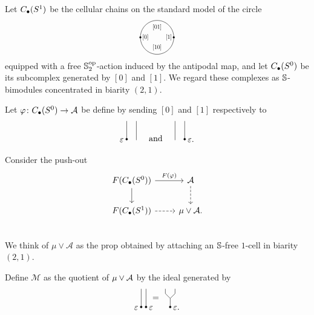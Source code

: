 Let $\chains(S^1)$ be the cellular chains on the standard model of the circle
\begin{equation*}
\begin{tikzpicture}
\draw (0,0) circle (20pt);
\node[scale=.7] at (0,12pt){$[01]$};
\node[scale=.7] at (0,-12pt){$[10]$};
\node[scale=.7] at (-14pt,0){$[0]$};
\node[scale=.7] at (14pt,0){$[1]$};
\draw [fill] (-20pt,0) circle [radius=1pt];
\draw [fill] (20pt,0) circle [radius=1pt];
\end{tikzpicture}
\end{equation*}
equipped with a free $\S^\op_2$-action induced by the antipodal map, and let $\chains(S^0)$ be its subcomplex generated by $[0]$ and $[1]$.
We regard these complexes as $\S$-bimodules concentrated in biarity $(2,1)$.

Let $\varphi \colon \chains(S^0) \to \A$ be define by sending $[0]$ and $[1]$ respectively to
\begin{equation*}
	\begin{tikzpicture}[scale=.2]
	\draw (-4,0)--(-4,4);
	\draw (-6,0)--(-6,4);
	\draw [fill] (-6,.2) circle [radius=.2];
	\node [left] at (-6,0) {$\varepsilon$};
	
	\node at (0,.4) {and};
	
	\draw (4,0)--(4,4);
	\draw (6,0)--(6,4);
	\draw [fill] (6,.2) circle [radius=.2];
	\node [right] at (6,0) {$\varepsilon$.};
	\end{tikzpicture}
\end{equation*}

Consider the push-out
\begin{equation*}
\begin{tikzcd}
F(\chains(S^0)) \arrow[r, "F(\varphi)"] \arrow[d] & \A \arrow[d, dashed] \\
F(\chains(S^1)) \arrow[r, dashed] & \mu \vee \A. \\
\end{tikzcd}
\end{equation*}
We think of $\mu \vee \mathcal A$ as the prop obtained by attaching an $\S$-free $1$-cell in biarity $(2,1)$.

Define $\mathcal M$ as the quotient of $\mu \vee \A$ by the ideal generated by
\begin{equation*}
\begin{tikzpicture}[scale=.2]
\draw (0,0)--(0,4);
\draw [fill] (0,.2) circle [radius=.2];
\node [left] at (0,0) {$\varepsilon$};
\draw (1,0)--(1,4);
\draw [fill] (1,.2) circle [radius=.2];
\node [right] at (1,0) {$\varepsilon$};
\node at (3,2) {=};

\draw (5,4)--(5,3)--(6,2)--(6,0);
\draw (7,4)--(7,3)--(6,2);
\draw [fill] (6,.2) circle [radius=.2];
\node [right] at (6,0) {$\varepsilon$.};
\end{tikzpicture}
\end{equation*}